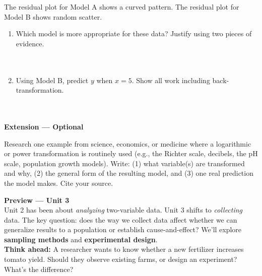 \documentclass[10pt]{article}
\begin{document}
\vspace{10pt}
The residual plot for Model A shows a curved pattern. The residual plot for Model B shows
random scatter.

\begin{enumerate}[label=\textbf{(\alph*)}, leftmargin=2em, itemsep=0.18in]

  \item Which model is more appropriate for these data? Justify using two pieces of evidence.\\[8pt]
        \writeline\\[3pt]\writeline\\[3pt]\writeline

  \item Using Model B, predict $y$ when $x = 5$. Show all work including back-transformation.\\[8pt]
        \writeline\\[3pt]\writeline\\[3pt]\writeline

\end{enumerate}

\vspace{0.18in}

\begin{extensionbox}
\small\textbf{Extension --- Optional}

Research one example from science, economics, or medicine where a logarithmic or power
transformation is routinely used (e.g., the Richter scale, decibels, the pH scale,
population growth models). Write: (1) what variable(s) are transformed and why, (2) the
general form of the resulting model, and (3) one real prediction the model makes. Cite
your source.
\end{extensionbox}

\vspace{0.16in}

\begin{tcolorbox}[colback=greenbg, colframe=greenacc, boxrule=0.8pt, arc=2mm,
    left=4mm, right=4mm, top=3mm, bottom=3mm]
\small\textbf{Preview --- Unit 3}\\[4pt]
Unit 2 has been about \emph{analyzing} two-variable data. Unit 3 shifts to \emph{collecting}
data. The key question: does the way we collect data affect whether we can generalize results
to a population or establish cause-and-effect? We'll explore \textbf{sampling methods} and
\textbf{experimental design}.\\[6pt]
\textbf{Think ahead:} A researcher wants to know whether a new fertilizer increases tomato
yield. Should they observe existing farms, or design an experiment? What's the difference?\\[6pt]
\writeline\\[2pt]\writeline
\end{tcolorbox}
\end{document}
